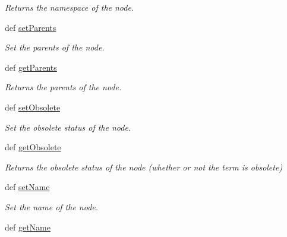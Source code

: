 \begin{DoxyCompactItemize}
\begin{DoxyCompactList}\small\item\em Returns the namespace of the node. \end{DoxyCompactList}\item 
def \hyperlink{classgographer_1_1_g_o_node_1_1_g_o_node_ae99aa1efe2438fc3c971d6f7718943b4}{set\-Parents}
\begin{DoxyCompactList}\small\item\em Set the parents of the node. \end{DoxyCompactList}\item 
\hypertarget{classgographer_1_1_g_o_node_1_1_g_o_node_a3cd34159abd352b56c25dececb1fbe5d}{def \hyperlink{classgographer_1_1_g_o_node_1_1_g_o_node_a3cd34159abd352b56c25dececb1fbe5d}{get\-Parents}}\label{classgographer_1_1_g_o_node_1_1_g_o_node_a3cd34159abd352b56c25dececb1fbe5d}

\begin{DoxyCompactList}\small\item\em Returns the parents of the node. \end{DoxyCompactList}\item 
def \hyperlink{classgographer_1_1_g_o_node_1_1_g_o_node_a82b8251a7dd9698728a4640679242663}{set\-Obsolete}
\begin{DoxyCompactList}\small\item\em Set the obsolete status of the node. \end{DoxyCompactList}\item 
\hypertarget{classgographer_1_1_g_o_node_1_1_g_o_node_aa6a0d9f76513f8dea1d9e3b8a26654e8}{def \hyperlink{classgographer_1_1_g_o_node_1_1_g_o_node_aa6a0d9f76513f8dea1d9e3b8a26654e8}{get\-Obsolete}}\label{classgographer_1_1_g_o_node_1_1_g_o_node_aa6a0d9f76513f8dea1d9e3b8a26654e8}

\begin{DoxyCompactList}\small\item\em Returns the obsolete status of the node (whether or not the term is obsolete) \end{DoxyCompactList}\item 
def \hyperlink{classgographer_1_1_g_o_node_1_1_g_o_node_afb34878daea4862be2712452aa901d65}{set\-Name}
\begin{DoxyCompactList}\small\item\em Set the name of the node. \end{DoxyCompactList}\item 
\hypertarget{classgographer_1_1_g_o_node_1_1_g_o_node_ab2c001a8212e96502b53863d910f2c49}{def \hyperlink{classgographer_1_1_g_o_node_1_1_g_o_node_ab2c001a8212e96502b53863d910f2c49}{get\-Name}}\label{classgographer_1_1_g_o_node_1_1_g_o_node_ab2c001a8212e96502b53863d910f2c49}


\end{DoxyCompactItemize}
